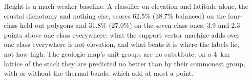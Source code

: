 Height is a much weaker baseline. A classifier on elevation and latitude alone, the crustal dichotomy and nothing
else, scores 62.5\% (38.7\% balanced) on the four-class held-out polygons and 31.8\% (27.0\%) on the seven-class
ones, 3.9 and 2.3 points above one class everywhere: what the support vector machine adds over one class everywhere
is not elevation, and what beats it is where the labels lie, not how high.
The geologic map's unit groups \citep{Tanaka2014} are no substitute: on a 4~km lattice of the stack they are
predicted no better than by their commonest group, with or without the thermal bands, which add at most a point.

